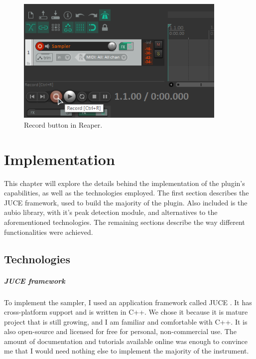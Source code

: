 \documentclass[12pt, a4paper, hidelinks]{report}
\begin{document}
	
	\begin{figure}[h!]
		\centering
		\includegraphics[width=0.9\textwidth]{u/rec.png}
		\caption{Record button in Reaper.}
		\label{fig:rec}
	\end{figure}
	
	\newpage
	\chapter{Implementation}
	This chapter will explore the details behind the implementation of the plugin's capabilities, as well as the technologies employed. The first section describes the JUCE framework, used to build the majority of the plugin. Also included is the aubio library, with it's peak detection module, and alternatives to the aforementioned technologies. The remaining sections describe the way different functionalities were achieved.
	\section{Technologies}   
	\paragraph{JUCE framework\\}
	To implement the sampler, I used an application framework called JUCE \cite{juceweb}. It has cross-platform support and is written in C++. We chose it because it is mature project that is still growing, and I am familiar and comfortable with C++. It is also open-source and licensed for free for personal, non-commercial use. The amount of documentation and tutorials available online was enough to convince me that I would need nothing else to implement the majority of the instrument.
	
\end{document}
